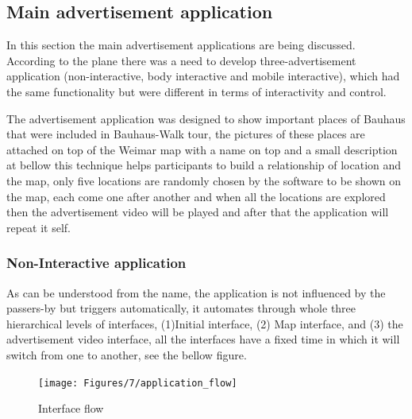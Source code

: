 \subsection{Main advertisement application}
In this section the main advertisement applications are being discussed.
According to the plane there was a need to develop three-advertisement application (non-interactive, body interactive and mobile interactive), which had the same functionality but were different in terms of interactivity and control.

The advertisement application was designed to show important places of Bauhaus that were included in Bauhaus-Walk tour, the pictures of these places are attached on top of the Weimar map with a name on top and a small description at bellow this technique helps participants to build a relationship of location and the map, only five locations are randomly chosen by the software to be shown on the map, each come one after another and when all the locations are explored then the advertisement video will be played and after that the application will repeat it self.


\subsubsection{Non-Interactive application}
As can be understood from the name, the application is not influenced by the passers-by but triggers automatically, it automates through whole three hierarchical levels of interfaces, (1)Initial interface, (2) Map interface, and (3) the advertisement video interface, all the interfaces have a fixed time in which it will switch from one to another, see the bellow figure.

\begin{figure}[H]
    \centering
    \texttt{[image: Figures/7/application\_flow]}
    \caption{Interface flow}%
    \label{fig:InterfaceFlow}%
\end{figure}

